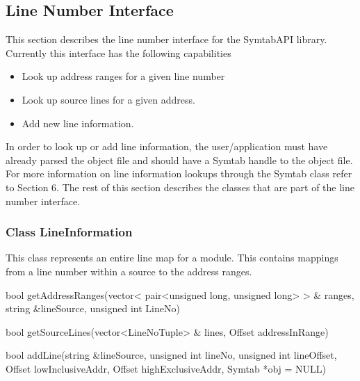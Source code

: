 \subsection{Line Number Interface}

This section describes the line number interface for the SymtabAPI library. Currently this interface has the following capabilities
\begin{itemize}
    \item Look up address ranges for a given line number
    \item Look up source lines for a given address.
    \item Add new line information.
\end{itemize}

In order to look up or add line information, the user/application must have already parsed the object file and should have a Symtab handle to the object file. For more information on line information lookups through the Symtab class refer to Section 6. The rest of this section describes the classes that are part of the line number interface.

\subsubsection{Class LineInformation}
This class represents an entire line map for a module. This contains mappings from a line number within a source to the address ranges.

\begin{apient}
bool getAddressRanges(vector< pair<unsigned long, unsigned long> > & ranges, 
string &lineSource, unsigned int LineNo)
\end{apient}

\begin{apient}
bool getSourceLines(vector<LineNoTuple> & lines, Offset addressInRange)
\end{apient}

\begin{apient}
bool addLine(string &lineSource, unsigned int lineNo, 
            unsigned int lineOffset, Offset lowInclusiveAddr, 
            Offset highExclusiveAddr, Symtab *obj = NULL)
\end{apient}

